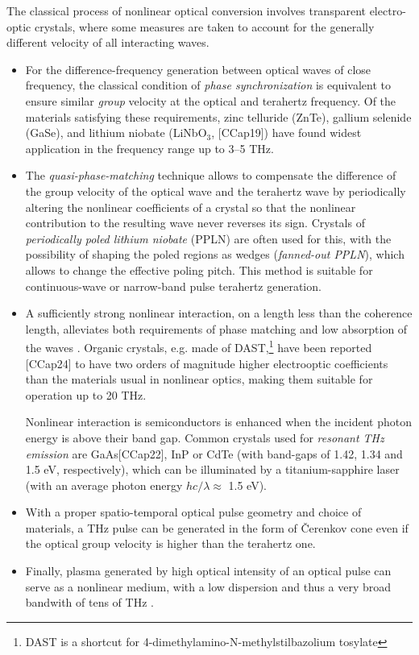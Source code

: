 The classical process of nonlinear optical conversion involves transparent electro-optic crystals, where some measures are taken to account for the generally different velocity of all interacting waves.
\begin{itemize}
\item{For the difference-frequency generation between optical waves of close frequency, the classical condition of \textit{phase synchronization} is equivalent to ensure similar \textit{group} velocity at the optical and terahertz frequency. Of the materials satisfying these requirements, zinc telluride (ZnTe), gallium selenide (GaSe), and lithium niobate (LiNbO$_{3}$, [CCap19]) have found widest application in the frequency range up to 3--5 THz. } 
\item{The \textit{quasi-phase-matching} technique allows to compensate the difference of the group velocity of the optical wave and the terahertz wave by periodically altering the nonlinear coefficients of a crystal so that the nonlinear contribution to the resulting wave never reverses its sign. Crystals of \textit{periodically poled lithium niobate} (PPLN) are often used for this, with the possibility of shaping the poled regions as wedges (\textit{fanned-out PPLN}), which allows to change the effective poling pitch. This method is suitable for continuous-wave or narrow-band pulse terahertz generation.  }  %
\item{A sufficiently strong nonlinear interaction, on a length less than the coherence length, alleviates both requirements of phase matching and low absorption of the waves \cite{leitenstorfer1999detectors}. Organic crystals, e.g. made of DAST,\footnote{DAST is a shortcut for 4-dimethylamino-N-methylstilbazolium tosylate}
have been reported \cite{han2000use}[CCap24]
to have two orders of magnitude higher electrooptic coefficients than the materials usual in nonlinear optics, making them suitable for operation up to 20 THz. 

Nonlinear interaction is semiconductors is enhanced when the incident photon energy is above their band gap. Common crystals used for \textit{resonant THz emission} are GaAs[CCap22], InP  or CdTe (with band-gaps of 1.42, 1.34 and 1.5 eV, respectively), which can be illuminated by a titanium-sapphire laser (with an average photon energy $hc/\lambda \approx$ 1.5 eV).} 
\item{With a proper spatio-temporal optical pulse geometry and choice of materials,\cite{auston1984cherenkov} a THz pulse can be generated in the form of Čerenkov cone even if the optical group velocity is higher than the terahertz one.}
\item{Finally, plasma generated by high optical intensity of an optical pulse can serve as a nonlinear medium, with a low dispersion and thus a very broad bandwith of tens of THz \cite{loffler2000generation,chen2007terahertz,tong2012}. }
 \end{itemize}

